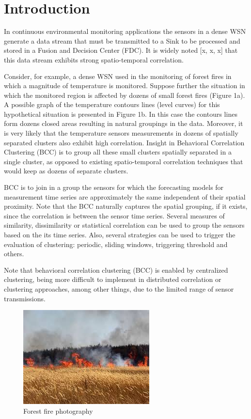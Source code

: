\documentclass[conference]{IEEEtran}
\begin{document}
\section{Introduction}

In continuous environmental monitoring applications the sensors in a dense WSN
generate a data stream that must be transmitted to a Sink to be processed and
stored in a Fusion and Decision Center (FDC). It is widely noted [x, x, x] that
this data stream exhibits strong spatio-temporal correlation.

Consider, for example, a dense WSN used in the monitoring of forest fires in
which a magnitude of temperature is monitored. Suppose further the situation in
which the monitored region is affected by dozens of small forest fires (Figure
1a). A possible graph of the temperature contours lines (level curves) for this
hypothetical situation is presented in Figure 1b. In this case the contours
lines form dozens closed areas resulting in natural groupings in the data.
Moreover, it is very likely that the temperature sensors measurements in dozens
of spatially separated clusters also exhibit high correlation. Insight in
Behavioral Correlation Clustering (BCC) is to group all these small clusters
spatially separated in a single cluster, as opposed to existing spatio-temporal
correlation techniques that would keep as dozens of separate clusters.

BCC is to join in a group the sensors for which the forecasting models for
measurement time series are approximately the same independent of their spatial
proximity.  Note that the BCC naturally captures the spatial grouping, if it
exists, since the correlation is between the sensor time series. Several
measures of similarity, dissimilarity or statistical correlation can be used to
group the sensors based on the its time series. Also, several strategies can be
used to trigger the evaluation of clustering: periodic, sliding windows,
triggering threshold and others.

Note that behavioral correlation clustering (BCC) is enabled by centralized
clustering, being more difficult to implement in distributed correlation or
clustering approaches, among other things, due to the limited range of sensor
transmissions.

\begin{figure}[!htb]
\centering
	\includegraphics[scale=0.7]{I1.png}
    \caption{Forest fire photography}
    \label{lab}
\end{figure}
\end{document}
